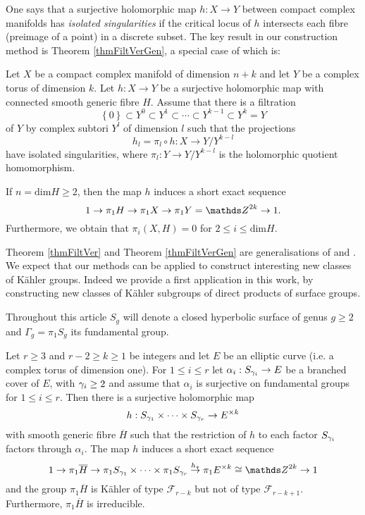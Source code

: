 One says that a surjective holomorphic map $h: X\rightarrow Y$ between compact complex manifolds has \textit{isolated singularities} if the critical locus of $h$ intersects each fibre (preimage of a point) in a discrete subset. The key result in our construction method is Theorem \ref{thmFiltVerGen}, a special case of which is:
 
 \begin{theorem}
 Let $X$ be a compact complex manifold of dimension $n+k$ and let $Y$ be a complex torus of dimension $k$. Let $h:X\rightarrow Y$ be a surjective holomorphic map with connected smooth generic fibre $H$. Assume that there is a filtration
 \[
  \left\{0\right\} \subset Y^0\subset Y^1 \subset \cdots \subset Y^{k-1}\subset Y^k=Y
 \]
of $Y$ by complex subtori $Y^l$ of dimension $l$ such that the projections
\[
h_l=\pi_l\circ h: X\rightarrow Y/Y^{k-l}
\]
have isolated singularities, where $\pi_l: Y\rightarrow Y/Y^{k-l}$ is the holomorphic quotient homomorphism.

If $n=\mathrm{dim}H\geq 2$, then the map $h$ induces a short exact sequence 
\[
 1 \rightarrow \pi_1 H \rightarrow \pi_1 X \rightarrow \pi_1 Y= \ZZ^{2k}\rightarrow 1.
\]
Furthermore, we obtain that $\pi_i(X,H)=0$ for $2\leq i \leq \mathrm{dim}H$.
\label{thmFiltVer}
\end{theorem} 

Theorem \ref{thmFiltVer} and Theorem \ref{thmFiltVerGen} are generalisations of \cite[Theorem C]{DimPapSuc-09-II} and \cite[Theorem 2.2]{BriLlo-16}. We expect that our methods can be applied to construct interesting new classes of K\"ahler groups. Indeed we provide a first application in this work, by constructing new classes of K\"ahler subgroups of direct products of surface groups.

\begin{notation*}
Throughout this article $S_{g}$ will denote a closed hyperbolic surface of genus $g\geq 2$ and $\Gamma_{g}=\pi_1 S_{g}$ its fundamental group.
\end{notation*}

 \begin{theorem}
  Let $r\geq 3$ and $r-2\geq k \geq 1$ be integers and let $E$ be an elliptic curve (i.e. a complex torus of dimension one). For $1\leq i \leq r$ let $\alpha_i: S_{\gamma_i}\rightarrow E$ be a branched cover of $E$, with $\gamma_i\geq 2$ and assume that $\alpha_i$ is surjective on fundamental groups for $1\leq i \leq r$. Then there is a surjective holomorphic map 
  \[
   h: S_{\gamma_1}\times \cdots \times S_{\gamma_r}\rightarrow E^{\times k}
  \] 
  with smooth generic fibre $\overline{H}$ such that the restriction of $h$ to each factor $S_{\gamma_i}$ factors through $\alpha_i$. The map $h$ induces a short exact sequence
  \[
   1\rightarrow \pi_1 \overline{H}\rightarrow  \pi_1 S_{\g_1}\times \cdots \times \pi_1 S_{\g_r}\stackrel{h_{\ast}}{\rightarrow} \pi_1 E^{\times k} \cong \ZZ^{2k}\rightarrow 1
  \]
  and the group $\pi_1 \overline{H}$ is K\"ahler of type $\mathcal{F}_{r-k}$ but not of type $\mathcal{F}_{r-k+1}$. Furthermore, $\pi_1 \overline{H}$ is irreducible.
  \label{thmIntroA}
 \end{theorem}  

